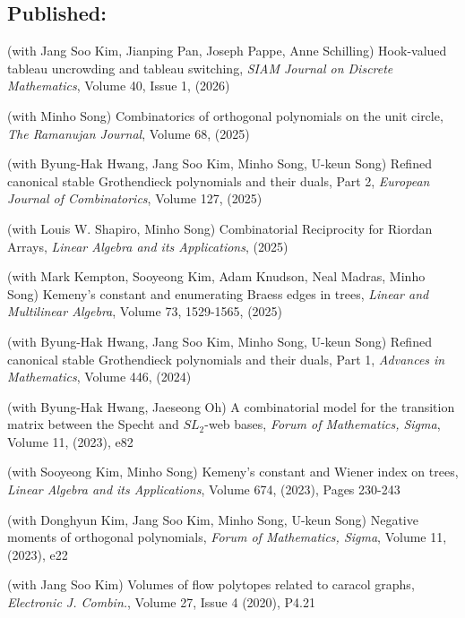 \documentclass[letterpaper]{article}
\begin{document}
\subsection*{Published:}
\begin{etaremune}
\item (with Jang Soo Kim, Jianping Pan, Joseph Pappe, Anne Schilling) Hook-valued tableau uncrowding and tableau switching, {\it SIAM Journal on Discrete Mathematics}, Volume 40, Issue 1, (2026)
\item (with Minho Song) Combinatorics of orthogonal polynomials on the unit circle, {\it The Ramanujan Journal}, Volume 68, (2025) 
\item (with Byung-Hak Hwang, Jang Soo Kim, Minho Song, U-keun Song) Refined canonical stable Grothendieck polynomials and their duals, Part 2, {\it European Journal of Combinatorics}, Volume 127, (2025)
\item (with Louis W. Shapiro, Minho Song) Combinatorial Reciprocity for Riordan Arrays, {\it Linear Algebra and its Applications}, (2025)
\item (with Mark Kempton, Sooyeong Kim, Adam Knudson, Neal Madras, Minho Song) Kemeny’s constant and enumerating Braess edges in trees, {\it Linear and Multilinear Algebra}, Volume 73, 1529-1565, (2025)
\item (with Byung-Hak Hwang, Jang Soo Kim, Minho Song, U-keun Song) Refined canonical stable Grothendieck polynomials and their duals, Part 1,
  {\it Advances in Mathematics}, Volume 446, (2024)
\item (with Byung-Hak Hwang, Jaeseong Oh) A combinatorial model for the transition matrix between the Specht and \( SL_2 \)-web bases,
  {\it Forum of Mathematics, Sigma}, Volume 11, (2023), e82
\item (with Sooyeong Kim, Minho Song) Kemeny’s constant and Wiener index on trees,
  {\it Linear Algebra and its Applications}, Volume 674, (2023), Pages 230-243
\item (with Donghyun Kim, Jang Soo Kim, Minho Song, U-keun Song) Negative moments of orthogonal polynomials,
  {\it Forum of Mathematics, Sigma}, Volume 11, (2023), e22
\item (with Jang Soo Kim) Volumes of flow polytopes related to caracol graphs,
  {\it Electronic J. Combin.}, Volume 27, Issue 4 (2020), P4.21
\end{etaremune}
\end{document}
